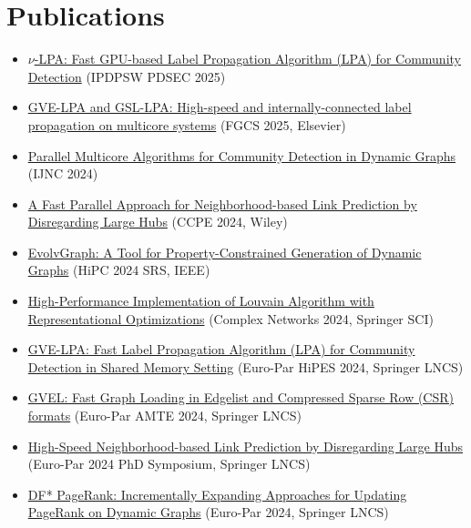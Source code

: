 \section*{Publications}

\begin{itemize}[noitemsep, leftmargin=*]
  \item \href{https://ieeexplore.ieee.org/abstract/document/11105845}{$\nu$-LPA: Fast GPU-based Label Propagation Algorithm (LPA) for Community Detection} (IPDPSW PDSEC 2025)
  \item \href{https://www.sciencedirect.com/science/article/pii/S0167739X25002912}{GVE-LPA and GSL-LPA: High-speed and internally-connected label propagation on multicore systems} (FGCS 2025, Elsevier)
  \item \href{https://www.jstage.jst.go.jp/article/ijnc/15/1/15_2/_article/-char/ja/}{Parallel Multicore Algorithms for Community Detection in Dynamic Graphs} (IJNC 2024)
  \item \href{https://onlinelibrary.wiley.com/doi/10.1002/cpe.8331}{A Fast Parallel Approach for Neighborhood-based Link Prediction by Disregarding Large Hubs} (CCPE 2024, Wiley)
  \item \href{https://ieeexplore.ieee.org/abstract/document/10898993}{EvolvGraph: A Tool for Property-Constrained Generation of Dynamic Graphs} (HiPC 2024 SRS, IEEE)
  \item \href{https://link.springer.com/chapter/10.1007/978-3-031-82435-7_11}{High-Performance Implementation of Louvain Algorithm with Representational Optimizations} (Complex Networks 2024, Springer SCI)
  \item \href{https://link.springer.com/chapter/10.1007/978-3-031-90203-1_9}{GVE-LPA: Fast Label Propagation Algorithm (LPA) for Community Detection in Shared Memory Setting} (Euro-Par HiPES 2024, Springer LNCS)
  \item \href{https://link.springer.com/chapter/10.1007/978-3-031-90200-0_22}{GVEL: Fast Graph Loading in Edgelist and Compressed Sparse Row (CSR) formats} (Euro-Par AMTE 2024, Springer LNCS)
  \item \href{https://link.springer.com/chapter/10.1007/978-3-031-90203-1_42}{High-Speed Neighborhood-based Link Prediction by Disregarding Large Hubs} (Euro-Par 2024 PhD Symposium, Springer LNCS)
  \item \href{https://link.springer.com/chapter/10.1007/978-3-031-69583-4_22}{DF* PageRank: Incrementally Expanding Approaches for Updating PageRank on Dynamic Graphs} (Euro-Par 2024, Springer LNCS)

\end{itemize}
